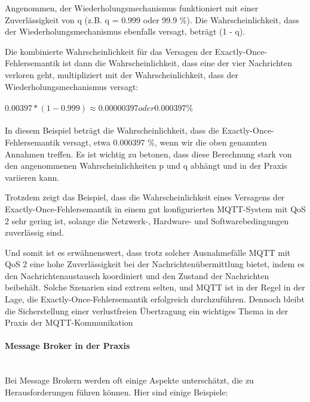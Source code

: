 \documentclass[../vs-script-first-v01.tex]{subfiles}
\begin{document}
Angenommen, der Wiederholungsmechanismus funktioniert mit einer Zuverlässigkeit von q (z.B. q = 0.999 oder 99.9 \%). Die Wahrscheinlichkeit, dass der Wiederholungsmechanismus ebenfalls versagt, beträgt (1 - q).

Die kombinierte Wahrscheinlichkeit für das Versagen der Exactly-Once-Fehlersemantik ist dann die Wahrscheinlichkeit, dass eine der vier Nachrichten verloren geht, multipliziert mit der Wahrscheinlichkeit, dass der Wiederholungsmechanismus versagt:
\\\\
$0.00397 * (1 - 0.999) \approx 0.00000397 oder 0.000397 \%$
\\\\
In diesem Beispiel beträgt die Wahrscheinlichkeit, dass die Exactly-Once-Fehlersemantik versagt, etwa 0.000397 \%, wenn wir die oben genannten Annahmen treffen. Es ist wichtig zu betonen, dass diese Berechnung stark von den angenommenen Wahrscheinlichkeiten p und q abhängt und in der Praxis variieren kann.

Trotzdem zeigt das Beispiel, dass die Wahrscheinlichkeit eines Versagens der Exactly-Once-Fehlersemantik in einem gut konfigurierten MQTT-System mit QoS 2 sehr gering ist, solange die Netzwerk-, Hardware- und Softwarebedingungen zuverlässig sind.

Und somit ist es erwähnenswert, dass trotz solcher Ausnahmefälle MQTT mit QoS 2 eine hohe Zuverlässigkeit bei der Nachrichtenübermittlung bietet, indem es den Nachrichtenaustausch koordiniert und den Zustand der Nachrichten beibehält. Solche Szenarien sind extrem selten, und MQTT ist in der Regel in der Lage, die Exactly-Once-Fehlersemantik erfolgreich durchzuführen. Dennoch bleibt die Sicherstellung einer verlustfreien Übertragung ein wichtiges Thema in der Praxis der MQTT-Kommunikation

\paragraph{Message Broker in der Praxis\\\\}

Bei Message Brokern werden oft einige Aspekte unterschätzt, die zu Herausforderungen führen können. Hier sind einige Beispiele:
\end{document}
